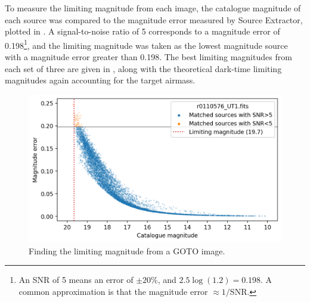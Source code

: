 \begin{colsection}
To measure the limiting magnitude from each image, the catalogue magnitude of each source was compared to the magnitude error measured by Source Extractor, plotted in . A signal-to-noise ratio of 5 corresponds to a magnitude error of 0.198\footnote{An SNR of 5 means an error of $\pm20\%$, and $2.5\log(1.2)=0.198$. A common approximation is that the magnitude error $\approx 1/$SNR.}, and the limiting magnitude was taken as the lowest magnitude source with a magnitude error greater than 0.198. The best limiting magnitudes from each set of three are given in , along with the theoretical dark-time limiting magnitudes again accounting for the target airmass.

\begin{figure}[t]
    \begin{center}
        \includegraphics[width=\linewidth]{images/throughput/limiting_mag_real2.png}
    \end{center}
    \caption[Finding the limiting magnitude from a GOTO image]{
        Finding the limiting magnitude from a GOTO image.
    }\label{fig:lim_mag}
\end{figure}

\newpage


\end{colsection}
